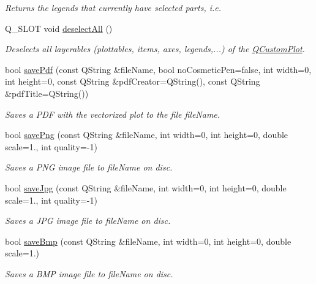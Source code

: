 \begin{DoxyCompactItemize}
\begin{DoxyCompactList}\small\item\em Returns the legends that currently have selected parts, i.\+e. \end{DoxyCompactList}\item 
Q\+\_\+\+S\+L\+O\+T void \hyperlink{classQCustomPlot_a9d4808ab925b003054085246c92a257c}{deselect\+All} ()
\begin{DoxyCompactList}\small\item\em Deselects all layerables (plottables, items, axes, legends,...) of the \hyperlink{classQCustomPlot}{Q\+Custom\+Plot}. \end{DoxyCompactList}\item 
bool \hyperlink{classQCustomPlot_a632da44c6d94ea8b271eb483b08b5114}{save\+Pdf} (const Q\+String \&file\+Name, bool no\+Cosmetic\+Pen=false, int width=0, int height=0, const Q\+String \&pdf\+Creator=Q\+String(), const Q\+String \&pdf\+Title=Q\+String())
\begin{DoxyCompactList}\small\item\em Saves a P\+D\+F with the vectorized plot to the file {\itshape file\+Name}. \end{DoxyCompactList}\item 
bool \hyperlink{classQCustomPlot_a7636261aff1f6d25c9da749ece3fc8b8}{save\+Png} (const Q\+String \&file\+Name, int width=0, int height=0, double scale=1., int quality=-\/1)
\begin{DoxyCompactList}\small\item\em Saves a P\+N\+G image file to {\itshape file\+Name} on disc. \end{DoxyCompactList}\item 
bool \hyperlink{classQCustomPlot_a490c722092d1771e8ce4a7a73dfd84ab}{save\+Jpg} (const Q\+String \&file\+Name, int width=0, int height=0, double scale=1., int quality=-\/1)
\begin{DoxyCompactList}\small\item\em Saves a J\+P\+G image file to {\itshape file\+Name} on disc. \end{DoxyCompactList}\item 
bool \hyperlink{classQCustomPlot_a6629d9e8e6da4bf18055ee0257fdce9a}{save\+Bmp} (const Q\+String \&file\+Name, int width=0, int height=0, double scale=1.)
\begin{DoxyCompactList}\small\item\em Saves a B\+M\+P image file to {\itshape file\+Name} on disc. \end{DoxyCompactList}\item 

\end{DoxyCompactItemize}
